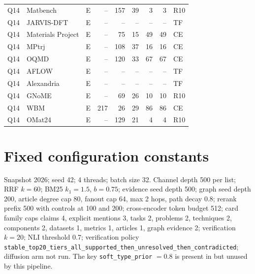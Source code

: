 \documentclass[11pt,a4paper]{article}
\begin{document}
\begin{longtable}{p{0.7cm}p{3.9cm}p{0.5cm}rrrrrp{0.85cm}}
Q14 & Matbench & E & -- & 157 & 39 & 3 & 3 & R10 \\
Q14 & JARVIS-DFT & E & -- & -- & -- & -- & -- & TF \\
Q14 & Materials Project & E & -- & 75 & 15 & 49 & 49 & CE \\
Q14 & MPtrj & E & -- & 108 & 37 & 16 & 16 & CE \\
Q14 & OQMD & E & -- & 120 & 33 & 67 & 67 & CE \\
Q14 & AFLOW & E & -- & -- & -- & -- & -- & TF \\
Q14 & Alexandria & E & -- & -- & -- & -- & -- & TF \\
Q14 & GNoME & E & -- & 69 & 26 & 10 & 10 & R10 \\
Q14 & WBM & E & 217 & 26 & 29 & 86 & 86 & CE \\
Q14 & OMat24 & E & -- & 129 & 21 & 4 & 4 & R10 \\
\end{longtable}

\section{Fixed configuration constants}

Snapshot 2026; seed 42; 4 threads; batch size 32. Channel depth 500 per list; RRF $k = 60$; BM25
$k_1 = 1.5$, $b = 0.75$; evidence seed depth 500; graph seed depth 200, article degree cap 80, fanout cap
64, max 2 hops, path decay 0.8; rerank prefix 500 with controls at 100 and 200; cross-encoder token budget
512; card family caps claims 4, explicit mentions 3, tasks 2, problems 2, techniques 2, components 2,
datasets 1, metrics 1, articles 1, graph evidence 2; verification $k = 20$; NLI threshold 0.7; verification
policy \texttt{stable\_top20\_tiers\_all\_supported\_then\_unresolved\_then\_contradicted}; diffusion arm not
run. The key \texttt{soft\_type\_prior} $= 0.8$ is present in  but unused by this
pipeline.
\end{document}
